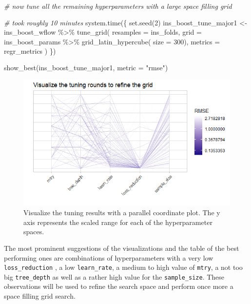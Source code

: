 \documentclass[
]{book}
\newenvironment{Shaded}{\begin{snugshade}}{\end{snugshade}}
\newcommand{\AttributeTok}[1]{\textcolor[rgb]{0.77,0.63,0.00}{#1}}
\newcommand{\CommentTok}[1]{\textcolor[rgb]{0.56,0.35,0.01}{\textit{#1}}}
\newcommand{\DecValTok}[1]{\textcolor[rgb]{0.00,0.00,0.81}{#1}}
\newcommand{\FunctionTok}[1]{\textcolor[rgb]{0.00,0.00,0.00}{#1}}
\newcommand{\NormalTok}[1]{#1}
\newcommand{\OtherTok}[1]{\textcolor[rgb]{0.56,0.35,0.01}{#1}}
\newcommand{\SpecialCharTok}[1]{\textcolor[rgb]{0.00,0.00,0.00}{#1}}
\newcommand{\StringTok}[1]{\textcolor[rgb]{0.31,0.60,0.02}{#1}}
\begin{document}
\begin{Shaded}
\begin{Highlighting}[]
\CommentTok{\# now tune all the remaining hyperparameters with a large space filling grid}

\CommentTok{\# took roughly 10 minutes}
\FunctionTok{system.time}\NormalTok{(\{}
  \FunctionTok{set.seed}\NormalTok{(}\DecValTok{2}\NormalTok{)}
\NormalTok{  ins\_boost\_tune\_major1 }\OtherTok{\textless{}{-}}\NormalTok{ ins\_boost\_wflow }\SpecialCharTok{\%\textgreater{}\%}
    \FunctionTok{tune\_grid}\NormalTok{(}
      \AttributeTok{resamples =}\NormalTok{ ins\_folds,}
      \AttributeTok{grid =}\NormalTok{ ins\_boost\_params }\SpecialCharTok{\%\textgreater{}\%}
        \FunctionTok{grid\_latin\_hypercube}\NormalTok{(}
          \AttributeTok{size =} \DecValTok{300}\NormalTok{),}
      \AttributeTok{metrics =}\NormalTok{ regr\_metrics}
\NormalTok{    )}
\NormalTok{\})}

\FunctionTok{show\_best}\NormalTok{(ins\_boost\_tune\_major1, }\AttributeTok{metric =} \StringTok{"rmse"}\NormalTok{)}
\end{Highlighting}
\end{Shaded}

\begin{figure}

{\centering \includegraphics[width=0.7\linewidth]{_pictures/tuning_ins_parallelcoord} 

}

\caption{Visualize the tuning results with a parallel coordinate plot. The y axis represents the scaled range for each of the hyperparameter spaces.}\label{fig:insparallelcoord}
\end{figure}

The most prominent suggestions of the visualizations and the table of the best performing ones are combinations of hyperparameters with a very low \texttt{loss\_reduction} , a low \texttt{learn\_rate}, a medium to high value of \texttt{mtry}, a not too big \texttt{tree\_depth} as well as a rather high value for the \texttt{sample\_size}.
These observations will be used to refine the search space and perform once more a space filling grid search.
\end{document}
